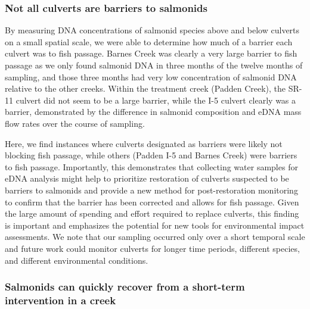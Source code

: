 \documentclass[
]{article}
\begin{document}
\hypertarget{not-all-culverts-are-barriers-to-salmonids}{%
\subsubsection{Not all culverts are barriers to
salmonids}\label{not-all-culverts-are-barriers-to-salmonids}}

By measuring DNA concentrations of salmonid species above and below
culverts on a small spatial scale, we were able to determine how much of
a barrier each culvert was to fish passage. Barnes Creek was clearly a
very large barrier to fish passage as we only found salmonid DNA in
three months of the twelve months of sampling, and those three months
had very low concentration of salmonid DNA relative to the other creeks.
Within the treatment creek (Padden Creek), the SR-11 culvert did not
seem to be a large barrier, while the I-5 culvert clearly was a barrier,
demonstrated by the difference in salmonid composition and eDNA mass
flow rates over the course of sampling.

Here, we find instances where culverts designated as barriers were
likely not blocking fish passage, while others (Padden I-5 and Barnes
Creek) were barriers to fish passage. Importantly, this demonstrates
that collecting water samples for eDNA analysis might help to prioritize
restoration of culverts suspected to be barriers to salmonids and
provide a new method for post-restoration monitoring to confirm that the
barrier has been corrected and allows for fish passage. Given the large
amount of spending and effort required to replace culverts, this finding
is important and emphasizes the potential for new tools for
environmental impact assessments. We note that our sampling occurred
only over a short temporal scale and future work could monitor culverts
for longer time periods, different species, and different environmental
conditions.

\hypertarget{salmonids-can-quickly-recover-from-a-short-term-intervention-in-a-creek}{%
\subsubsection{Salmonids can quickly recover from a short-term
intervention in a
creek}\label{salmonids-can-quickly-recover-from-a-short-term-intervention-in-a-creek}}
\end{document}
